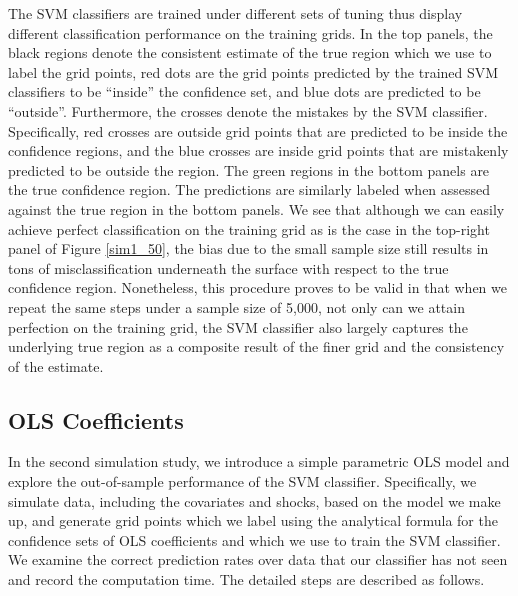 \documentclass[12pt]{article}
\theoremstyle{definition}
\begin{document}
The SVM classifiers are trained under different sets of tuning thus display different classification performance on the training grids. In the top panels, the black regions denote the consistent estimate of the true region which we use to label the grid points, red dots are the grid points predicted by the trained SVM classifiers to be ``inside'' the confidence set, and blue dots are predicted to be ``outside''. Furthermore, the crosses denote the mistakes by the SVM classifier. Specifically, red crosses are outside grid points that are predicted to be inside the confidence regions, and the blue crosses are inside grid points that are mistakenly predicted to be outside the region. The green regions in the bottom panels are the true confidence region. The predictions are similarly labeled when assessed against the true region in the bottom panels. We see that although we can easily achieve perfect classification on the training grid as is the case in the top-right panel of Figure \ref{sim1_50}, the bias due to the small sample size still results in tons of misclassification underneath the surface with respect to the true confidence region. Nonetheless, this procedure proves to be valid in that when we repeat the same steps under a sample size of 5,000, not only can we attain perfection on the training grid, the SVM classifier also largely captures the underlying true region as a composite result of the finer grid and the consistency of the estimate.


\subsection{OLS Coefficients}
In the second simulation study, we introduce a simple parametric OLS model and explore the out-of-sample performance of the SVM classifier. Specifically, we simulate data, including the covariates and shocks, based on the model we make up, and generate grid points which we label using the analytical formula for the confidence sets of OLS coefficients and which we use to train the SVM classifier. We examine the correct prediction rates over data that our classifier has not seen and record the computation time. The detailed steps are described as follows.
\end{document}
